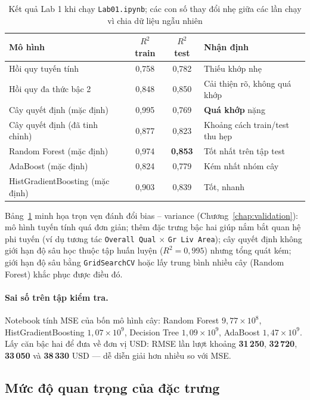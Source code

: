 \begin{table}[H]
\centering
\begin{tabular}{|l|c|c|l|}
\hline
\textbf{Mô hình} & \textbf{$R^2$ train} & \textbf{$R^2$ test} & \textbf{Nhận định} \\
\hline
Hồi quy tuyến tính & 0,758 & 0,782 & Thiếu khớp nhẹ \\ \hline
Hồi quy đa thức bậc 2 & 0,848 & 0,850 & Cải thiện rõ, không quá khớp \\ \hline
Cây quyết định (mặc định) & 0,995 & 0,769 & \textbf{Quá khớp} nặng \\ \hline
Cây quyết định (đã tinh chỉnh) & 0,877 & 0,823 & Khoảng cách train/test thu hẹp \\ \hline
Random Forest (mặc định) & 0,974 & \textbf{0,853} & Tốt nhất trên tập test \\ \hline
AdaBoost (mặc định) & 0,824 & 0,779 & Kém nhất nhóm cây \\ \hline
HistGradientBoosting (mặc định) & 0,903 & 0,839 & Tốt, nhanh \\ \hline
\end{tabular}
\caption{Kết quả Lab 1 khi chạy \texttt{Lab01.ipynb}; các con số thay đổi nhẹ giữa các lần chạy vì chia dữ liệu ngẫu nhiên}
\label{tab:lab-ames-r2}
\end{table}

Bảng~\ref{tab:lab-ames-r2} minh họa trọn vẹn đánh đổi bias -- variance (Chương~\ref{chap:validation}): mô hình tuyến tính quá đơn giản; thêm đặc trưng bậc hai giúp nắm bắt quan hệ phi tuyến (ví dụ tương tác \texttt{Overall Qual} $\times$ \texttt{Gr Liv Area}); cây quyết định không giới hạn độ sâu học thuộc tập huấn luyện ($R^2 = 0{,}995$) nhưng tổng quát kém; giới hạn độ sâu bằng \texttt{GridSearchCV} hoặc lấy trung bình nhiều cây (Random Forest) khắc phục được điều đó.

\paragraph{Sai số trên tập kiểm tra.} Notebook tính MSE của bốn mô hình cây: Random Forest $9{,}77 \times 10^8$, HistGradientBoosting $1{,}07 \times 10^9$, Decision Tree $1{,}09 \times 10^9$, AdaBoost $1{,}47 \times 10^9$. Lấy căn bậc hai để đưa về đơn vị USD: RMSE lần lượt khoảng \textbf{31\,250}, \textbf{32\,720}, \textbf{33\,050} và \textbf{38\,330} USD --- dễ diễn giải hơn nhiều so với MSE.

\subsection{Mức độ quan trọng của đặc trưng}

